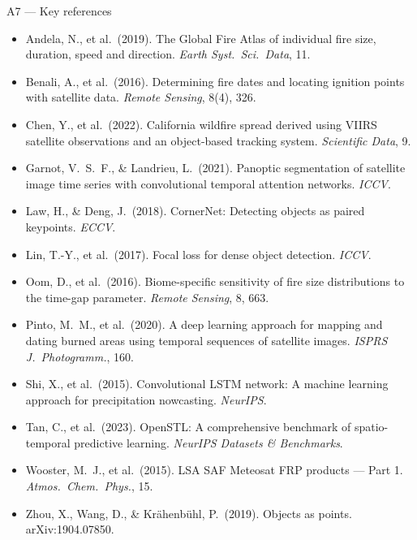 \documentclass[10pt,aspectratio=169]{beamer}
\begin{document}
\begin{frame}{A7 --- Key references}
  \scriptsize
  \begin{itemize}
    \item Andela, N., et al.\ (2019). The Global Fire Atlas of individual fire size, duration, speed and direction. \textit{Earth Syst.\ Sci.\ Data}, 11.
    \item Benali, A., et al.\ (2016). Determining fire dates and locating ignition points with satellite data. \textit{Remote Sensing}, 8(4), 326.
    \item Chen, Y., et al.\ (2022). California wildfire spread derived using VIIRS satellite observations and an object-based tracking system. \textit{Scientific Data}, 9.
    \item Garnot, V.\ S.\ F., \& Landrieu, L.\ (2021). Panoptic segmentation of satellite image time series with convolutional temporal attention networks. \textit{ICCV}.
    \item Law, H., \& Deng, J.\ (2018). CornerNet: Detecting objects as paired keypoints. \textit{ECCV}.
    \item Lin, T.-Y., et al.\ (2017). Focal loss for dense object detection. \textit{ICCV}.
    \item Oom, D., et al.\ (2016). Biome-specific sensitivity of fire size distributions to the time-gap parameter. \textit{Remote Sensing}, 8, 663.
    \item Pinto, M.\ M., et al.\ (2020). A deep learning approach for mapping and dating burned areas using temporal sequences of satellite images. \textit{ISPRS J.\ Photogramm.}, 160.
    \item Shi, X., et al.\ (2015). Convolutional LSTM network: A machine learning approach for precipitation nowcasting. \textit{NeurIPS}.
    \item Tan, C., et al.\ (2023). OpenSTL: A comprehensive benchmark of spatio-temporal predictive learning. \textit{NeurIPS Datasets \& Benchmarks}.
    \item Wooster, M.\ J., et al.\ (2015). LSA SAF Meteosat FRP products --- Part 1. \textit{Atmos.\ Chem.\ Phys.}, 15.
    \item Zhou, X., Wang, D., \& Krähenbühl, P.\ (2019). Objects as points. arXiv:1904.07850.
  \end{itemize}
\end{frame}
\end{document}
